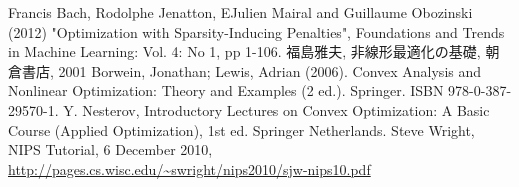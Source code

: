 \documentclass[a4paper,11pt]{jsarticle}
\numberwithin{theorem}{section}  %
\numberwithin{equation}{section} %
\begin{document}
\begin{thebibliography}{99}
 Francis Bach, Rodolphe Jenatton, EJulien Mairal and Guillaume Obozinski (2012) "Optimization with Sparsity-Inducing Penalties", 
Foundations and Trends in Machine Learning: Vol. 4: No 1, pp 1-106. 
 福島雅夫, 非線形最適化の基礎, 朝倉書店, 2001
  Borwein, Jonathan; Lewis, Adrian (2006). Convex Analysis and Nonlinear Optimization: Theory and Examples (2 ed.). Springer. ISBN 978-0-387-29570-1.
 Y. Nesterov, Introductory Lectures on Convex Optimization: A Basic Course (Applied Optimization), 1st ed.    Springer Netherlands.
 Steve Wright, NIPS Tutorial, 6 December 2010,\,\,\url{ http://pages.cs.wisc.edu/~swright/nips2010/sjw-nips10.pdf}
\end{thebibliography}
\end{document}
